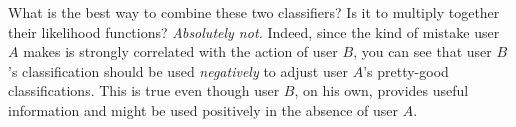 \documentclass[12pt]{article}
\begin{document}
What is the best way to combine these two classifiers?
Is it to multiply together their likelihood functions?
\emph{Absolutely not.}
Indeed, since the kind of mistake user $A$ makes is strongly correlated with the action of user $B$,
  you can see that user $B$'s classification should be used \emph{negatively} to adjust user $A$'s pretty-good classifications.
This is true even though user $B$, on his own, provides useful information and might be used positively in the absence of user $A$.
\end{document}

